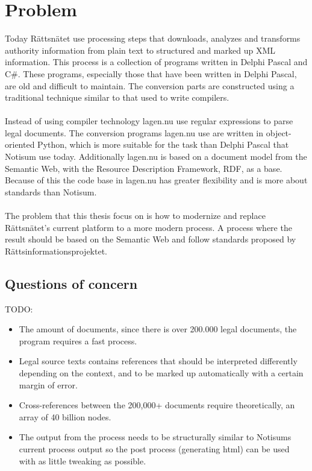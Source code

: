 \documentclass[a4paper,11pt]{kth-mag}
\begin{document}
\section{Problem}
Today Rättsnätet use processing steps that downloads, analyzes and transforms authority information from plain text to structured and marked up XML information. This process is a collection of programs written in Delphi Pascal and C\#. These programs, especially those that have been written in Delphi Pascal, are old and difficult to maintain. The conversion parts are constructed using a traditional technique similar to that used to write compilers.\\\\
Instead of using compiler technology lagen.nu use regular expressions to parse legal documents. The conversion programs lagen.nu use are written in object-oriented Python, which is more suitable for the task than Delphi Pascal that Notisum use today. Additionally lagen.nu is based on a document model from the Semantic Web, with the Resource Description Framework, RDF, as a base. Because of this the code base in lagen.nu has greater flexibility and is more about standards than Notisum.\\\\
The problem that this thesis focus on is how to modernize and replace Rättsnätet's current platform to a more modern process. A process where the result should be based on the Semantic Web and follow standards proposed by Rättsinformationsprojektet.  \subsection{Questions of concern} TODO:

\begin{itemize} 
\item The amount of documents, since there is over 200.000 legal documents, the program requires a fast process.
\item Legal source texts contains references that should be interpreted differently depending on the context, and to be marked up automatically with a certain margin of error.
\item Cross-references between the 200,000+ documents require theoretically, an array of 40 billion nodes.
\item The output from the process needs to be structurally similar to Notisums current process output so the post process (generating html) can be used with as little tweaking as possible.
\end{itemize}
\end{document}
